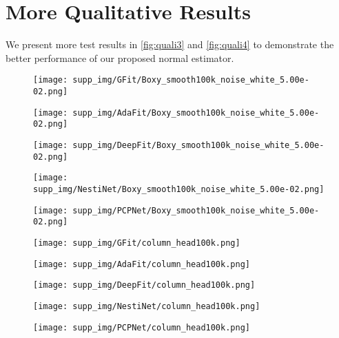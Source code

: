 \documentclass[runningheads]{llncs}
\begin{document}
\section{More Qualitative Results}
We present more test results in \cref{fig:quali3} and \cref{fig:quali4} to demonstrate the better performance of our proposed normal estimator. 
\begin{figure*}
\centering
	\begin{subfigure}{0.15\linewidth}
		\centering
		\texttt{[image: supp\_img/GFit/Boxy\_smooth100k\_noise\_white\_5.00e-02.png]}
\end{subfigure}
	\hspace{0.1cm}
	\begin{subfigure}{0.15\linewidth}
		\centering
		\texttt{[image: supp\_img/AdaFit/Boxy\_smooth100k\_noise\_white\_5.00e-02.png]}
\end{subfigure}
	\hspace{0.1cm}
	\begin{subfigure}{0.17\linewidth}
		\centering
		\texttt{[image: supp\_img/DeepFit/Boxy\_smooth100k\_noise\_white\_5.00e-02.png]}
\end{subfigure}
	\hspace{0.1cm}
	\begin{subfigure}{0.17\linewidth}
		\centering
		\texttt{[image: supp\_img/NestiNet/Boxy\_smooth100k\_noise\_white\_5.00e-02.png]}
\end{subfigure}
	\hspace{0.1cm}
	\begin{subfigure}{0.17\linewidth}
		\centering
		\texttt{[image: supp\_img/PCPNet/Boxy\_smooth100k\_noise\_white\_5.00e-02.png]}
\end{subfigure}
	
\begin{subfigure}{0.15\linewidth}
		\centering
		\texttt{[image: supp\_img/GFit/column\_head100k.png]}
\end{subfigure}
	\hspace{0.1cm}
	\begin{subfigure}{0.15\linewidth}
		\centering
		\texttt{[image: supp\_img/AdaFit/column\_head100k.png]}
\end{subfigure}
	\hspace{0.1cm}
	\begin{subfigure}{0.17\linewidth}
		\centering
		\texttt{[image: supp\_img/DeepFit/column\_head100k.png]}
\end{subfigure}
	\hspace{0.1cm}
	\begin{subfigure}{0.17\linewidth}
		\centering
		\texttt{[image: supp\_img/NestiNet/column\_head100k.png]}
\end{subfigure}
	\hspace{0.1cm}
	\begin{subfigure}{0.17\linewidth}
		\centering
		\texttt{[image: supp\_img/PCPNet/column\_head100k.png]}
\end{subfigure}
	

\end{figure*}
\end{document}
